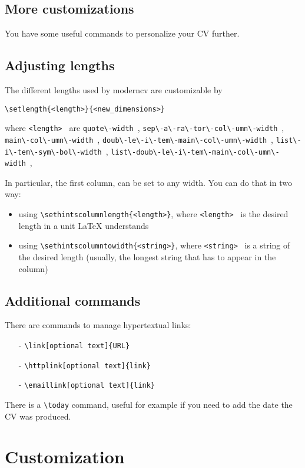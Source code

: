 \documentclass[a4paper,11pt]{article}
\newcommand{\Code}[1]{\lstinline!#1!~} %
\begin{document}
\subsection{More customizations}

You have some useful commands to personalize your CV further.


\subsection*{Adjusting lengths}
The different lengths used by moderncv are customizable by
\begin{verbatim}
\setlength{<length>}{<new_dimensions>}
\end{verbatim}
where \Code{<length>} are \Code{quote\-width}, \Code{sep\-a\-ra\-tor\-col\-umn\-width}, \Code{main\-col\-umn\-width}, \Code{doub\-le\-i\-tem\-main\-col\-umn\-width}, \Code{list\-i\-tem\-sym\-bol\-width}, \Code{list\-doub\-le\-i\-tem\-main\-col\-umn\-width}, 

In particular, the first column, can be set to any width. You can do that in two way:
\begin{itemize}
 \item using \verb|\sethintscolumnlength{<length>}|, where  \Code{<length>} is the desired length in a unit LaTeX understands
 \item using \verb|\sethintscolumntowidth{<string>}|, where \Code{<string>} is a string of the desired length (usually, the longest string that has to appear in the column)
\end{itemize}

\subsection*{Additional commands}
There are commands to manage hypertextual links:
\begin{itemize}
 \item[-] \verb|\link[optional text]{URL}|
 \item[-] \verb|\httplink[optional text]{link}|
 \item[-] \verb|\emaillink[optional text]{link}|
\end{itemize}

There is a \verb|\today| command, useful for example if you need to add the date the CV was produced.

\section{Customization}
\label{section:customization}
\end{document}
